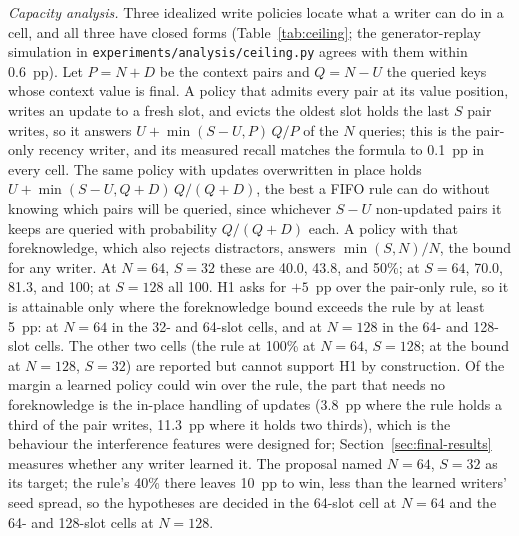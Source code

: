 \documentclass[conference]{IEEEtran}
\begin{document}
\textit{Capacity analysis.} Three idealized write policies locate what a
writer can do in a cell, and all three have closed forms
(Table~\ref{tab:ceiling}; the generator-replay simulation in
\texttt{experiments/analysis/ceiling.py} agrees with them within 0.6~pp). Let
$P = N + D$ be the context pairs and $Q = N - U$ the queried keys whose context
value is final. A policy that admits every pair at its value position, writes
an update to a fresh slot, and evicts the oldest slot holds the last $S$ pair
writes, so it answers $U + \min(S - U, P)\,Q/P$ of the $N$ queries; this is
the pair-only recency writer, and its measured recall matches the formula to
0.1~pp in every cell. The same policy with updates overwritten in place holds
$U + \min(S - U, Q + D)\,Q/(Q + D)$, the best a FIFO rule can do without
knowing which pairs will be queried, since whichever $S - U$ non-updated
pairs it keeps are queried with probability $Q/(Q + D)$ each. A policy with that foreknowledge, which also
rejects distractors, answers $\min(S, N)/N$, the bound for any writer. At
$N = 64$, $S = 32$ these are 40.0, 43.8, and 50\%; at $S = 64$, 70.0, 81.3,
and 100; at $S = 128$ all 100. H1 asks for $+5$~pp over the pair-only rule, so
it is attainable only where the foreknowledge bound exceeds the rule by at
least 5~pp: at $N = 64$ in the 32- and 64-slot cells, and at $N = 128$ in the
64- and 128-slot cells. The other two cells (the rule at 100\% at $N = 64$,
$S = 128$; at the bound at $N = 128$, $S = 32$) are reported but cannot
support H1 by construction. Of the margin a learned policy could win over the
rule, the part that needs no foreknowledge is the in-place handling of updates
(3.8~pp where the rule holds a third of the pair writes, 11.3~pp where it
holds two thirds), which is the behaviour the interference features were designed for;
Section~\ref{sec:final-results} measures whether any writer learned it. The
proposal named $N = 64$, $S = 32$ as its target; the rule's 40\% there leaves
10~pp to win, less than the learned writers' seed spread, so the hypotheses
are decided in the 64-slot cell at $N = 64$ and the 64- and 128-slot cells at
$N = 128$.
\end{document}
